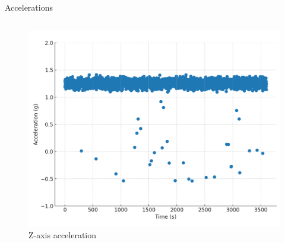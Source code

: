 \begin{frame}{Accelerations}
    \begin{columns}[onlytextwidth]
        \begin{column}{0.46\textwidth}
            \vspace{0.5em}
            \hspace{-2em}
            \begin{figure}
                \centering
                \includegraphics[height=0.6\textheight,width=1.05\textwidth,keepaspectratio]{images/z_acceleration.png}
                \caption{Z-axis acceleration}
            \end{figure}
        \end{column}


\end{columns}
\end{frame}
